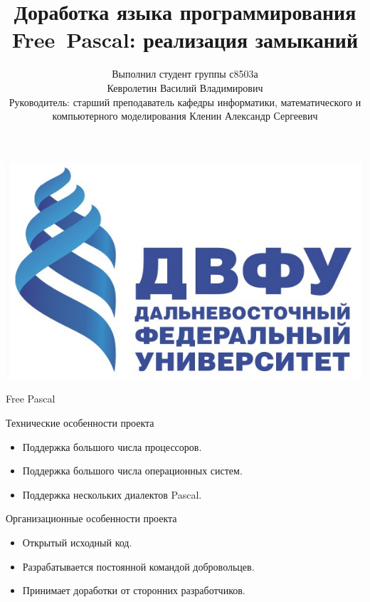 \documentclass[roman,12pt]{beamer}
\begin{document}
\title{Доработка языка программирования Free~Pascal: реализация замыканий}  
\author{Выполнил студент группы с8503а \\ Кевролетин Василий
  Владимирович\\ Руководитель: старший преподаватель кафедры
  информатики, математического и компьютерного моделирования Кленин
  Александр Сергеевич}

\begin{frame}
\begin{center}
\includegraphics[scale=0.15]{logo.jpeg}
\end{center}
\maketitle

\end{frame}

\begin{frame}{Free Pascal}
  \begin{block}{Технические особенности проекта}
    \begin{itemize}
    \item Поддержка большого числа процессоров.
    \item Поддержка большого числа операционных систем.
    \item Поддержка нескольких диалектов Pascal.
    \end{itemize}
  \end{block}
  \begin{block}{Организационные особенности проекта}
    \begin{itemize}
    \item Открытый исходный код.
    \item Разрабатывается постоянной командой добровольцев.
    \item Принимает доработки от сторонних разработчиков.
    \end{itemize}  
  \end{block}
\end{frame}
\end{document}
